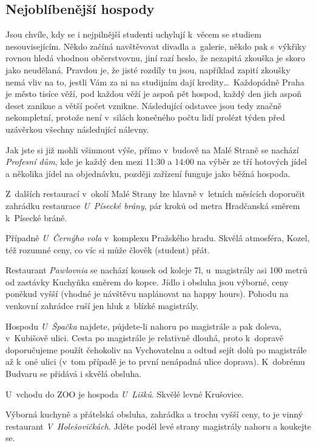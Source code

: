 \subsection{Nejoblíbenější hospody}

Jsou chvíle, kdy se i nejpilnější studenti uchylují k~věcem se
studiem nesouvisejícím. Někdo začíná navštěvovat divadla
a~galerie, někdo pak s~výkřiky  rovnou hledá
vhodnou občerstvovnu, jiní razí heslo, že nezapitá zkouška je
skoro jako neudělaná. Pravdou je, že jisté rozdíly tu jsou,
například zapití zkoušky nemá vliv na to, jestli Vám za ni na
studijním dají kredity\dots\ Každopádně Praha je město tisíce
věží, pod každou věží je aspoň pět hospod, každý den jich aspoň
deset zanikne a větší počet vznikne. Následující odstavce jsou
tedy značně nekompletní, protože není v~silách konečného počtu
lidí prolézt týden před uzávěrkou všechny následující nálevny.

Jak jste si již mohli všimnout výše, přímo v~budově na Malé Straně
se nachází {\it Profesní dům}, kde je každý den mezi 11:30 a 14:00
na výběr ze tří hotových jídel a několika jídel na objednávku,
později zařízení funguje jako běžná hospoda.

Z~dalších restaurací v~okolí Malé Strany lze hlavně v~letních
měsících doporučit zahrádku restaurace {\it U~Písecké brány}, pár
kroků od metra Hradčanská směrem k~Písecké bráně.

Případně {\it U~Černýho vola} v~komplexu Pražského hradu. Skvělá
atmosféra, Kozel, též rozumné ceny, co víc si může člověk
(student) přát.

Restaurant {\it Pawlovnia} se nachází kousek od koleje \17l,
u~magistrály asi 100 metrů od zastávky Kuchyňka směrem do kopce.
Jídlo i obsluha jsou výborné, ceny poněkud vyšší (vhodné je
návštěvu naplánovat na happy hours). Pohodu na venkovní zahrádce
ruší jen hluk z~blízké magistrály.

Hospodu {\it U~Špačka\/} najdete, půjdete-li nahoru po magistrále a pak
doleva, v~Kubišově ulici. Cesta po magistrále je relativně dlouhá, proto
k~dopravě doporučujeme použít čehokoliv na Vychovatelnu a odtud sejít
dolů po magistrále až k~oné ulici (v~tom případě je to první nenápadná
ulice doprava). K~dobrému Budvaru se přidává i skvělá obsluha.

U~vchodu do ZOO je hospoda {\it U~Lišků}. Skvělé levné Krušovice.

Výborná kuchyně a přátelská obsluha, zahrádka a trochu vyšší ceny,
to je vinný restaurant {\it V~Holešovičkách}.  Jděte podél levé strany
magistrály nahoru a koukejte se.

